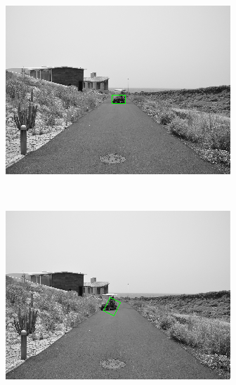 \begin{figure}[h!]
\begin{subfigure}[b]{0.24\columnwidth}
	    \includegraphics[width=\textwidth]{sequence/seq3}\label{fig:seq3}
        \end{subfigure}%
        ~
        \begin{subfigure}[b]{0.24\columnwidth}
	    \includegraphics[width=\textwidth]{sequence/seq4}\label{fig:seq4}
        \end{subfigure}%
        \\
        \begin{subfigure}[b]{0.24\columnwidth}

\end{subfigure}
\end{figure}
